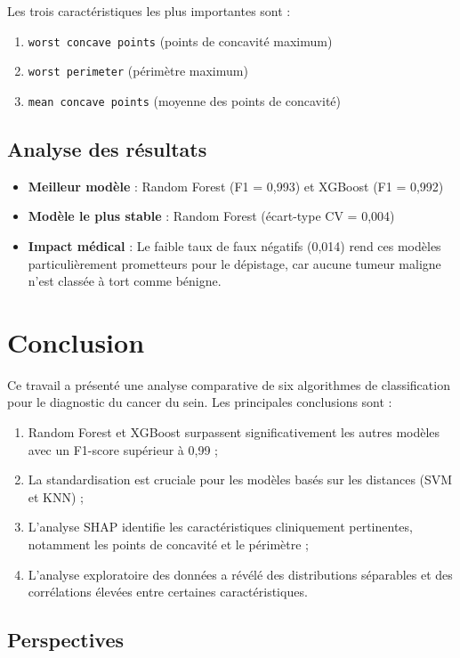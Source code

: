 \documentclass[conference]{IEEEtran}
\begin{document}
Les trois caractéristiques les plus importantes sont :
\begin{enumerate}
\item \texttt{worst concave points} (points de concavité maximum)
\item \texttt{worst perimeter} (périmètre maximum)
\item \texttt{mean concave points} (moyenne des points de concavité)
\end{enumerate}

\subsection{Analyse des résultats}

\begin{itemize}
\item \textbf{Meilleur modèle} : Random Forest (F1 = 0,993) et XGBoost (F1 = 0,992)
\item \textbf{Modèle le plus stable} : Random Forest (écart-type CV = 0,004)
\item \textbf{Impact médical} : Le faible taux de faux négatifs (0,014) rend ces modèles particulièrement prometteurs pour le dépistage, car aucune tumeur maligne n'est classée à tort comme bénigne.
\end{itemize}

\section{Conclusion}

Ce travail a présenté une analyse comparative de six algorithmes de classification pour le diagnostic du cancer du sein. Les principales conclusions sont :

\begin{enumerate}
\item Random Forest et XGBoost surpassent significativement les autres modèles avec un F1-score supérieur à 0,99 ;
\item La standardisation est cruciale pour les modèles basés sur les distances (SVM et KNN) ;
\item L'analyse SHAP identifie les caractéristiques cliniquement pertinentes, notamment les points de concavité et le périmètre ;
\item L'analyse exploratoire des données a révélé des distributions séparables et des corrélations élevées entre certaines caractéristiques.
\end{enumerate}

\subsection{Perspectives}
\end{document}

